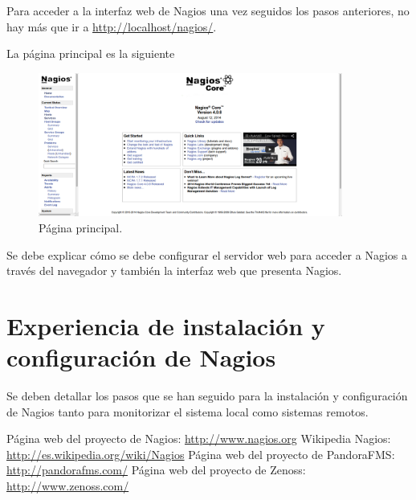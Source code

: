 \documentclass[11pt,a4paper]{article}
\begin{document}
Para acceder a la interfaz web de Nagios una vez seguidos los pasos anteriores, no hay más que ir a \url{http://localhost/nagios/}.

La página principal es la siguiente

\begin{figure}[h!]
  \centering
\includegraphics[width=10cm]{images/0.png} 
  \caption{Página principal.}
\end{figure}

Se debe explicar cómo se debe configurar el servidor web para acceder a Nagios a través del navegador
y  también la interfaz web que presenta Nagios.

\section{Experiencia de instalación y configuración de Nagios}

Se deben detallar los pasos que se han seguido para la instalación y configuración de Nagios
tanto para monitorizar el sistema local como sistemas remotos.

\begin{thebibliography}{1}

 Página web del proyecto de Nagios: \url{http://www.nagios.org}
 Wikipedia Nagios: \url{http://es.wikipedia.org/wiki/Nagios}
 Página web del proyecto de PandoraFMS: \url{http://pandorafms.com/}
 Página web del proyecto de Zenoss: \url{http://www.zenoss.com/}
\end{thebibliography}
\end{document}

